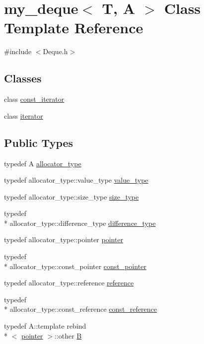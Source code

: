 \hypertarget{classmy__deque}{\section{my\-\_\-deque$<$ T, A $>$ Class Template Reference}
\label{classmy__deque}
}


{\ttfamily \#include $<$Deque.\-h$>$}

\subsection*{Classes}
\begin{DoxyCompactItemize}
\item 
class \hyperlink{classmy__deque_1_1const__iterator}{const\-\_\-iterator}
\item 
class \hyperlink{classmy__deque_1_1iterator}{iterator}
\end{DoxyCompactItemize}
\subsection*{Public Types}
\begin{DoxyCompactItemize}
\item 
typedef A \hyperlink{classmy__deque_a34236f0fef930decd11dc683f40a38be}{allocator\-\_\-type}
\item 
typedef allocator\-\_\-type\-::value\-\_\-type \hyperlink{classmy__deque_ae9c156c405acc57623a4601ce755596f}{value\-\_\-type}
\item 
typedef allocator\-\_\-type\-::size\-\_\-type \hyperlink{classmy__deque_a61e5e5317fe72a381ce4d45f09544b02}{size\-\_\-type}
\item 
typedef \\*
allocator\-\_\-type\-::difference\-\_\-type \hyperlink{classmy__deque_ac85676cb2492fbc9bbc6f1a30e9d3c73}{difference\-\_\-type}
\item 
typedef allocator\-\_\-type\-::pointer \hyperlink{classmy__deque_a58e82fc365a3b086367479515e1515be}{pointer}
\item 
typedef \\*
allocator\-\_\-type\-::const\-\_\-pointer \hyperlink{classmy__deque_a8fea5edeb2b2cf3dd1246dc3abf9b71b}{const\-\_\-pointer}
\item 
typedef allocator\-\_\-type\-::reference \hyperlink{classmy__deque_a4c34c14f397b7676445b37c87003116b}{reference}
\item 
typedef \\*
allocator\-\_\-type\-::const\-\_\-reference \hyperlink{classmy__deque_ad50d8b378580088cf77fa43f0640e49c}{const\-\_\-reference}
\item 
typedef A\-::template rebind\\*
$<$ \hyperlink{classmy__deque_a58e82fc365a3b086367479515e1515be}{pointer} $>$\-::other \hyperlink{classmy__deque_a1a55c016646bba79086d90d3cccde143}{B}
\end{DoxyCompactItemize}

